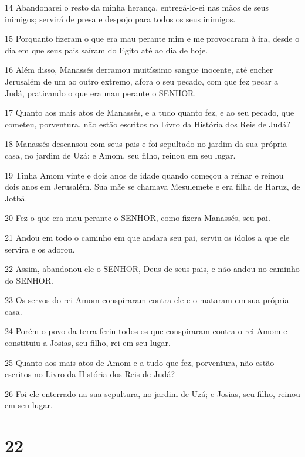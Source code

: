 \par 14 Abandonarei o resto da minha herança, entregá-lo-ei nas mãos de seus inimigos; servirá de presa e despojo para todos os seus inimigos.
\par 15 Porquanto fizeram o que era mau perante mim e me provocaram à ira, desde o dia em que seus pais saíram do Egito até ao dia de hoje.
\par 16 Além disso, Manassés derramou muitíssimo sangue inocente, até encher Jerusalém de um ao outro extremo, afora o seu pecado, com que fez pecar a Judá, praticando o que era mau perante o SENHOR.
\par 17 Quanto aos mais atos de Manassés, e a tudo quanto fez, e ao seu pecado, que cometeu, porventura, não estão escritos no Livro da História dos Reis de Judá?
\par 18 Manassés descansou com seus pais e foi sepultado no jardim da sua própria casa, no jardim de Uzá; e Amom, seu filho, reinou em seu lugar.
\par 19 Tinha Amom vinte e dois anos de idade quando começou a reinar e reinou dois anos em Jerusalém. Sua mãe se chamava Mesulemete e era filha de Haruz, de Jotbá.
\par 20 Fez o que era mau perante o SENHOR, como fizera Manassés, seu pai.
\par 21 Andou em todo o caminho em que andara seu pai, serviu os ídolos a que ele servira e os adorou.
\par 22 Assim, abandonou ele o SENHOR, Deus de seus pais, e não andou no caminho do SENHOR.
\par 23 Os servos do rei Amom conspiraram contra ele e o mataram em sua própria casa.
\par 24 Porém o povo da terra feriu todos os que conspiraram contra o rei Amom e constituiu a Josias, seu filho, rei em seu lugar.
\par 25 Quanto aos mais atos de Amom e a tudo que fez, porventura, não estão escritos no Livro da História dos Reis de Judá?
\par 26 Foi ele enterrado na sua sepultura, no jardim de Uzá; e Josias, seu filho, reinou em seu lugar.

\chapter{22}

